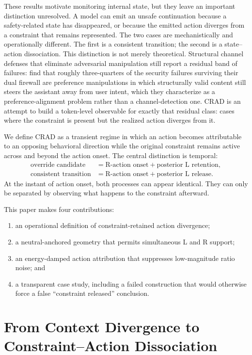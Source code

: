 \documentclass[10pt]{article}
\newcommand{\CRAD}{\textsc{CRAD}}
\begin{document}
These results motivate monitoring internal state, but they leave an important distinction unresolved. A model can emit an unsafe continuation because a safety-related state has disappeared, or because the emitted action diverges from a constraint that remains represented. The two cases are mechanistically and operationally different. The first is a consistent transition; the second is a state--action dissociation. This distinction is not merely theoretical. Structural channel defenses that eliminate adversarial manipulation still report a residual band of failures: \citet{abdelnabi2026firewalls} find that roughly three-quarters of the security failures surviving their dual firewall are preference manipulations in which structurally valid content still steers the assistant away from user intent, which they characterize as a preference-alignment problem rather than a channel-detection one. \CRAD{} is an attempt to build a token-level observable for exactly that residual class: cases where the constraint is present but the realized action diverges from it.

We define \CRAD{} as a transient regime in which an action becomes attributable to an opposing behavioral direction while the original constraint remains active across and beyond the action onset. The central distinction is temporal:
\begin{align}
\text{override candidate} &= \text{R-action onset} + \text{posterior L retention},\\
\text{consistent transition} &= \text{R-action onset} + \text{posterior L release}.
\end{align}
At the instant of action onset, both processes can appear identical. They can only be separated by observing what happens to the constraint afterward.

This paper makes four contributions:
\begin{enumerate}
  \item an operational definition of constraint-retained action divergence;
  \item a neutral-anchored geometry that permits simultaneous L and R support;
  \item an energy-damped action attribution that suppresses low-magnitude ratio noise; and
  \item a transparent case study, including a failed construction that would otherwise force a false ``constraint released'' conclusion.
\end{enumerate}

\section{From Context Divergence to Constraint--Action Dissociation}
\end{document}
